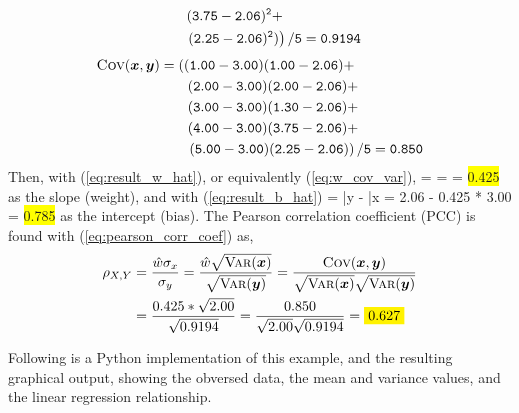 \begin{Hexample}
{\begin{align}
& \hspace{0.7cm} {\tt (3.75-2.06)^2 + } \nonumber \\
& \hspace{0.7cm} {\tt \left.(2.25-2.06)^2)\right)/5
  = 0.9194} 
\end{align}
\begin{align}
\mbox{\sc Cov}(\mbox{\boldmath $x$}, \mbox{\boldmath $y$}) &= {\tt \left((1.00-3.00)(1.00-2.06) + \right.} \nonumber \\
& \hspace{0.7cm} {\tt (2.00-3.00)(2.00-2.06) + } \nonumber \\
& \hspace{0.7cm} {\tt (3.00-3.00)(1.30-2.06) + } \nonumber \\ 
& \hspace{0.7cm} {\tt (4.00-3.00)(3.75-2.06) + } \nonumber \\
& \hspace{0.7cm} {\tt \left.(5.00-3.00)(2.25-2.06)\right)/5
  = 0.850} 
\end{align}
Then, with (\ref{eq:result_w_hat}), or 
equivalently (\ref{eq:w_cov_var}),
\be
{} = \frac{\cov(\vx, \vy)}{\var(\vx)} =  = \colorbox{yellow}{0.425}
\ee
as the slope (weight), and with (\ref{eq:result_b_hat})
\be
{} = \bar{y} -  \bar{x} = 2.06 - 0.425 * 3.00 = 
\colorbox{yellow}{0.785}
\ee
as the intercept (bias).
The Pearson correlation coefficient (PCC) is found 
with (\ref{eq:pearson_corr_coef}) as,
\begin{align}
\rho_{X,Y} 
&= \frac{\hat{w}\sigma_x}{\sigma_y} = 
\frac{\hat{w} \sqrt{\var(\vx)}}{\sqrt{\var(\vy)}} = 
\frac{\cov(\vx,\vy)}{\sqrt{\var(\vx)}\sqrt{\var(\vy)}} \nonumber \\
&=
\frac{0.425 * \sqrt{2.00}}{\sqrt{0.9194}} = 
\frac{0.850}{\sqrt{2.00}\sqrt{0.9194}} = 
\colorbox{yellow}{0.627}
\end{align}
}
\end{Hexample}

Following is a Python implementation of this example, and the
resulting graphical output, showing the obversed data, 
the mean and variance values, and the linear regression
relationship.

